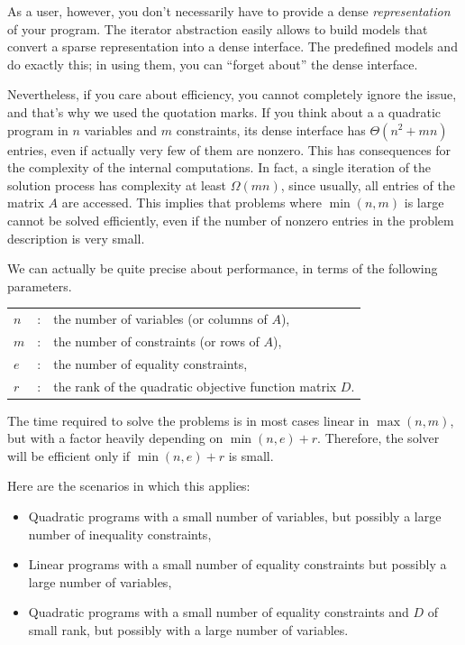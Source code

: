 As a user, however, you don't necessarily have to provide a dense
\emph{representation} of your program. The iterator abstraction 
easily allows to build models that convert a sparse representation 
into a dense interface. The predefined models  
and  do exactly this; in using them, 
you can ``forget about'' the dense interface.  

Nevertheless, if you care about efficiency, you cannot completely 
ignore the issue, and that's why we used the quotation marks. If
you think about a a quadratic program in $n$ variables and $m$
constraints, its dense interface has $\Theta(n^2 + mn)$ entries,
even if actually very few of them are nonzero. This has consequences 
for the complexity of the internal computations. In fact, a single
iteration of the solution process has complexity at least 
$\Omega(mn)$, since usually, all entries of the matrix $A$ are accessed. 
This implies that problems where $\min(n,m)$ is large cannot be solved
efficiently, even if the number of nonzero entries in the problem
description is very small.

We can actually be quite precise about performance, in terms of the 
following parameters.
\begin{tabular}{lcl}
$n$ &: & the number of variables (or columns of $A$),\\
$m$ &: & the number of constraints (or rows of $A$),\\
$e$ &: & the number of equality constraints,\\
$r$ &: & the rank of the quadratic objective function matrix $D$.
\end{tabular}

The time required to solve the problems is in most cases linear in 
$\max(n,m)$, but with a factor heavily depending on $\min(n,e)+r$.
Therefore, the solver will be efficient only if $\min(n,e)+r$ is 
small.

Here are the scenarios in which this applies:
\begin{itemize}
\item Quadratic programs with a small number of variables, but
  possibly a large number of inequality constraints,
\item Linear programs with a small number of equality constraints but
  possibly a large number of variables,
\item Quadratic programs with a small number of equality constraints and
  $D$ of small rank, but possibly with a large number of variables.
\end{itemize} 

